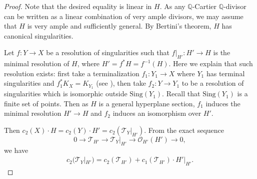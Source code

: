 \documentclass[12pt,twoside]{amsart}
\theoremstyle{definition}
\begin{document}
\begin{proof}
Note that the desired equality is linear in $H$. 
As any $\mathbb{Q}$-Cartier $\mathbb{Q}$-divisor can be written as a linear combination of very ample divisors, 
we may assume that $H$ is very ample and sufficiently general. By Bertini's theorem, $H$ has canonical singularities. 

 Let $f\colon Y\to X$ be a resolution of singularities such that $f|_{H'}\colon H'\to H$ is the minimal resolution of $H$, where $H'=f^*H=f^{-1}(H)$.
 Here we explain that such resolution exists: 
first take a terminalization $f_1\colon Y_1\to X$ where $Y_1$ has terminal singularities and $f_1^*K_X=K_{Y_1}$ (see \cite[Theorem~6.23]{KollarMori1998}), then take $f_2\colon Y\to Y_1$ to be a resolution of singularities which is isomorphic outside $\textrm{Sing}(Y_1)$. Recall that $\textrm{Sing}(Y_1)$ is a finite set of points. Then as $H$ is a general hyperplane section, $f_1$ induces the minimal resolution $H'\to H$ and $f_2$ induces an isomorphism over $H'$.


 Then $c_2(X)\cdot H=c_2(Y)\cdot H'=c_2(\mathcal T_Y|_{H'})$.
 From the exact sequence
 \[
 0\to \mathcal T_{H'}\to \mathcal T_Y|_{H'}\to \mathcal O_{H'}(H')\to 0,
 \]
 we have 
 \begin{align}
 c_2(\mathcal T_Y|_{H'})=c_2(\mathcal T_{H'})+c_1(\mathcal T_{H'})\cdot H'|_{H'}. \label{eq c21}
 \end{align} 


\end{proof}
\end{document}
